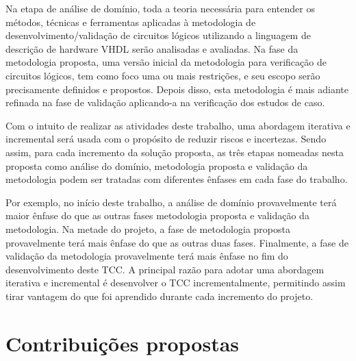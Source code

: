 Na etapa de análise de domínio, toda a teoria necessária para entender os métodos, técnicas e ferramentas aplicadas à metodologia de desenvolvimento/validação de circuitos lógicos utilizando a linguagem de descrição de hardware VHDL serão analisadas e avaliadas. Na fase da metodologia proposta, uma versão inicial da metodologia para verificação de circuitos lógicos, tem como foco uma ou mais restrições, e seu escopo serão precisamente definidos e propostos. Depois disso, esta metodologia é mais adiante refinada na fase de validação aplicando-a na verificação dos estudos de caso.

Com o intuito de realizar as atividades deste trabalho, uma abordagem iterativa e incremental será usada com o propósito de reduzir riscos e incertezas. Sendo assim, para cada incremento da solução proposta, as três etapas nomeadas nesta proposta como análise do domínio, metodologia proposta e validação da metodologia podem ser tratadas com diferentes ênfases em cada fase do trabalho.

Por exemplo, no início deste trabalho, a análise de domínio provavelmente terá maior ênfase do que as outras fases metodologia proposta e validação da metodologia. Na metade do projeto, a fase de metodologia proposta provavelmente terá mais ênfase do que as outras duas fases. Finalmente, a fase de validação da metodologia provavelmente terá mais ênfase no fim do desenvolvimento deste TCC. A principal razão para adotar uma abordagem iterativa e incremental é desenvolver o TCC incrementalmente, permitindo assim tirar vantagem do que foi aprendido durante cada incremento do projeto.


\section{Contribuições propostas}

